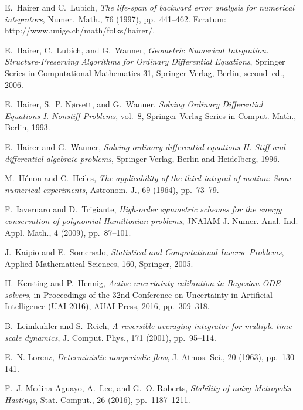 \documentclass{siamart1116}
\numberwithin{theorem}{section}
\begin{document}
{\begin{thebibliography}{10}
	{\sc E.~Hairer and C.~Lubich}, {\em The life-span of backward error analysis
		for numerical integrators}, Numer.\ Math., 76 (1997), pp.~441--462.
	\newblock Erratum: http://www.unige.ch/math/folks/hairer/.
	
	{\sc E.~Hairer, C.~Lubich, and G.~Wanner}, {\em Geometric Numerical
		Integration. Structure-Preserving Algorithms for Ordinary Differential
		Equations}, Springer Series in Computational Mathematics 31, Springer-Verlag,
	Berlin, second~ed., 2006.
	
	{\sc E.~Hairer, S.~P. N{\o{}}rsett, and G.~Wanner}, {\em Solving Ordinary
		Differential Equations I. Nonstiff Problems}, vol.~8, Springer Verlag Series
	in Comput. Math., Berlin, 1993.
	
	{\sc E.~Hairer and G.~Wanner}, {\em Solving ordinary differential equations II.
		Stiff and differential-algebraic problems}, Springer-Verlag, Berlin and
	Heidelberg, 1996.
	
	{\sc M.~H\'enon and C.~Heiles}, {\em The applicability of the third integral of
		motion: {S}ome numerical experiments}, Astronom. J., 69 (1964), pp.~73--79.
	
	{\sc F.~Iavernaro and D.~Trigiante}, {\em High-order symmetric schemes for the
		energy conservation of polynomial {H}amiltonian problems}, JNAIAM J. Numer.
	Anal. Ind. Appl. Math., 4 (2009), pp.~87--101.
	
	{\sc J.~Kaipio and E.~Somersalo}, {\em Statistical and Computational Inverse
		Problems}, Applied Mathematical Sciences, 160, Springer, 2005.
	
	{\sc H.~Kersting and P.~Hennig}, {\em Active uncertainty calibration in
		{B}ayesian {ODE} solvers}, in Proceedings of the 32nd Conference on
	Uncertainty in Artificial Intelligence (UAI 2016), {AUAI} Press, 2016,
	pp.~309--318.
	
	{\sc B.~Leimkuhler and S.~Reich}, {\em A reversible averaging integrator for
		multiple time-scale dynamics}, J. Comput. Phys., 171 (2001), pp.~95--114.
	
	{\sc E.~N. Lorenz}, {\em Deterministic nonperiodic flow}, J. Atmos. Sci., 20
	(1963), pp.~130--141.
	
	{\sc F.~J. Medina-Aguayo, A.~Lee, and G.~O. Roberts}, {\em Stability of noisy
		{M}etropolis--{H}astings}, Stat. Comput., 26 (2016), pp.~1187--1211.
	

\end{thebibliography}}
\end{document}

